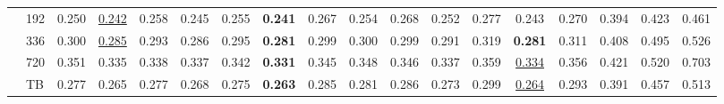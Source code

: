 \begin{table}
\begin{tabular}{@{}llcccccccccccccccc@{}}
 & 192 & 0.250 & \underline{0.242} & 0.258 & 0.245 & 0.255 & \textbf{0.241} & 0.267 & 0.254 & 0.268 & 0.252 & 0.277 & 0.243 & 0.270 & 0.394 & 0.423 & 0.461\\
 & 336 & 0.300 & \underline{0.285} & 0.293 & 0.286 & 0.295 & \textbf{0.281} & 0.299 & 0.300 & 0.299 & 0.291 & 0.319 & \textbf{0.281} & 0.311 & 0.408 & 0.495 & 0.526\\
 & 720 & 0.351 & 0.335 & 0.338 & 0.337 & 0.342 & \textbf{0.331} & 0.345 & 0.348 & 0.346 & 0.337 & 0.359 & \underline{0.334} & 0.356 & 0.421 & 0.520 & 0.703\\
 & TB & 0.277 & 0.265 & 0.277 & 0.268 & 0.275 & \textbf{0.263} & 0.285 & 0.281 & 0.286 & 0.273 & 0.299 & \underline{0.264} & 0.293 & 0.391 & 0.457 & 0.513\\
\bottomrule
\end{tabular}
\end{table}
